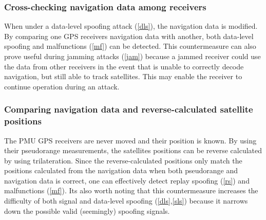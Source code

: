 \documentclass[12pt,english,a4paper]{article}
\begin{document}
\subsubsection{Cross-checking navigation data among receivers}\label{ccndar} %
When under a data-level spoofing attack (\ref{dls}), the navigation data is modified. By comparing one GPS receivers navigation data with another, both data-level spoofing and malfunctions (\ref{mf}) can be detected. This countermeasure can also prove useful during jamming attacks (\ref{jam}) because a jammed receiver could use the data from other receivers in the event that is unable to correctly decode navigation, but still able to track satellites. This may enable the receiver to continue operation during an attack. \cite{HengChouGao14}  

\subsubsection{Comparing navigation data and reverse-calculated satellite positions}\label{cndrcsp} %
The PMU GPS receivers are never moved and their position is known. By using their pseudorange measurements, the satellites positions can be reverse calculated by using trilateration. Since the reverse-calculated positions only match the positions calculated from the navigation data when both pseudorange and navigation data is correct, one can effectively detect replay spoofing (\ref{rs}) and malfunctions (\ref{mf}). Its also worth noting that this countermeasure increases the difficulty of both signal and data-level spoofing (\ref{dls},\ref{sls}) because it narrows down the possible valid (seemingly) spoofing signals. \cite{HengChouGao14} 
\end{document}
